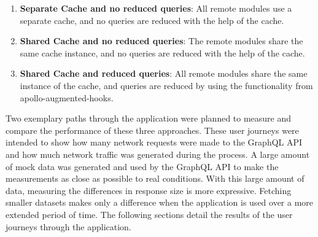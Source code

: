 \begin{enumerate}
  \item \textbf{Separate Cache and no reduced queries}: All remote modules use a separate cache, and no queries are reduced with the help of the cache.
  \item \textbf{Shared Cache and no reduced queries}: The remote modules share the same cache instance, and no queries are reduced with the help of the cache.
  \item \textbf{Shared Cache and reduced queries}: All remote modules share the same instance of the cache, and queries are reduced by using the functionality from apollo-augmented-hooks.
\end{enumerate}

\noindent Two exemplary paths through the application were planned to measure and compare the performance of these three approaches. These user journeys were intended to show how many network requests were made to the GraphQL \ac{API} and how much network traffic was generated during the process. A large amount of mock data was generated and used by the GraphQL \ac{API} to make the measurements as close as possible to real conditions. With this large amount of data, measuring the differences in response size is more expressive. Fetching smaller datasets makes only a difference when the application is used over a more extended period of time. The following sections detail the results of the user journeys through the application.






